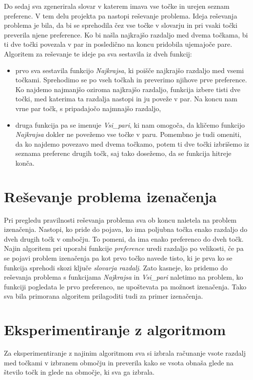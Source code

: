 \documentclass[12pt, a4paper]{article}
\begin{document}
Do sedaj sva zgenerirala slovar v katerem imava vse točke in urejen seznam preferenc.  V tem delu projekta pa nastopi reševanje problema. Ideja reševanja problema je bila, da bi se sprehodila čez vse točke v slovarju in pri vsaki točki preverila njene preference. Ko bi našla najkrajšo razdaljo med dvema točkama, bi ti dve točki povezala v par in posledično na koncu pridobila ujemajoče pare. Algoritem za reševanje te ideje pa sva sestavila iz dveh funkcij:
\begin{itemize}
	\item prvo sva sestavila funkcijo \textit{Najkrajsa}, ki poišče najkrajšo razdaljo med vsemi točkami. Sprehodimo se po vseh točkah in preverimo njihove prve preference. Ko najdemo najmanjšo oziroma najkrajšo razdaljo, funkcija izbere tisti dve točki, med katerima ta razdalja nastopi in ju poveže v par. Na koncu nam vrne par točk, s pripadajočo najmnajšo razdaljo,
	\item druga funkcija pa se imenuje \textit{Vsi_pari}, ki nam omogoča, da kličemo funkcijo \textit{Najkrajsa} dokler ne povežemo vse točke v paru. Pomembno je tudi omeniti, da ko najdemo povezavo med dvema točkamo, potem ti dve točki izbrišemo iz seznama preferenc drugih točk, saj tako dosežemo, da se funkcija hitreje konča.
\end{itemize}

\pagebreak
\section{Reševanje problema izenačenja}
Pri pregledu pravilnosti reševanja problema sva ob koncu naletela na problem izenačenja. Nastopi, ko pride do pojava, ko ima poljubna točka enako razdaljo do dveh drugih točk v ombočju. To pomeni, da ima enako preferenco do dveh točk. Najin algoritem pri uporabi funkcije \textit{preference} uredi razdaljo po velikosti, če pa se pojavi problem izenačenja pa kot prvo točko navede tisto, ki je prva ko se funkcija sprehodi skozi ključe \textit{slovarja razdalj}. Zato kasneje, ko pridemo do reševanja problema s funkcijama \textit{Najkrajsa} in \textit{Vsi_pari} naletimo na problem, ko funkciji pogledata le prvo preferenco, ne upoštevata pa možnost izenačenja. Tako sva bila primorana algoritem prilagoditi tudi za primer izenačenja. \\

\pagebreak
\section{Eksperimentiranje z algoritmom}
Za eksperimentiranje z najinim algoritmom sva si izbrala računanje vsote razdalj med točkami v izbranem območju in preverila kako se vsota obnaša glede na število točk in glede na območje, ki sva ga izbrala. \\
\end{document}
